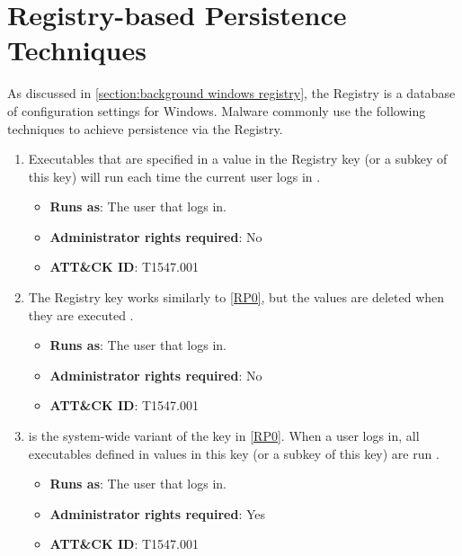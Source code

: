 \section{Registry-based Persistence Techniques}\label{section:registry-based persistence}
As discussed in \autoref{section:background windows registry}, the Registry is a database of configuration settings for Windows. Malware commonly use the following techniques to achieve persistence via the Registry.

\begin{enumerate}[label={\textbf{RP\arabic*}:}, ref=RP\arabic*, start=0]
    \item \label{RP0} Executables that are specified in a value in the Registry key  (or a subkey of this key) will run each time the current user logs in \cite{andrea-blog} \cite{run-key}.

    \begin{itemize}[label={}, leftmargin=*]
        \item \textbf{Runs as}: The user that logs in.
        \item \textbf{Administrator rights required}: No
        \item \textbf{ATT\&CK ID}: T1547.001
    \end{itemize}

    \item \label{RP1} The Registry key  works similarly to \autoref{RP0}, but the values are deleted when they are executed \cite{andrea-blog} \cite{run-key}.

    \begin{itemize}[label={}, leftmargin=*]
        \item \textbf{Runs as}: The user that logs in.
        \item \textbf{Administrator rights required}: No
        \item \textbf{ATT\&CK ID}: T1547.001
    \end{itemize}

    \item \label{RP2}  is the system-wide variant of the key in \autoref{RP0}. When a user logs in, all executables defined in values in this key (or a subkey of this key) are run \cite{andrea-blog} \cite{practical-malware-analysis} \cite{run-key}.

    \begin{itemize}[label={}, leftmargin=*]
        \item \textbf{Runs as}: The user that logs in.
        \item \textbf{Administrator rights required}: Yes
        \item \textbf{ATT\&CK ID}: T1547.001
    \end{itemize}


\end{enumerate}
